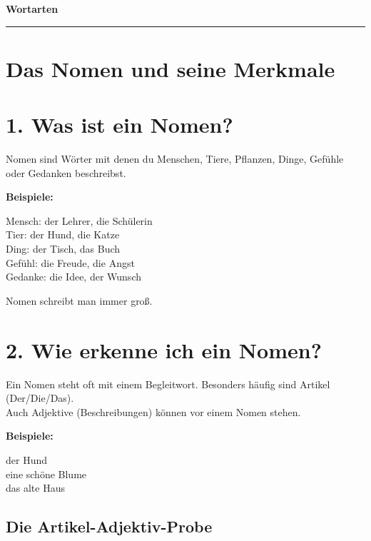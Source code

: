 \documentclass[a4paper,12pt]{article}
\newcommand{\linie}{\vspace{4pt}\hrule\vspace{10pt}}
\begin{document}
\begin{center}
    {\headerfont\LARGE\textbf{Wortarten}}\\[4pt]
\end{center}

\vspace{6pt}
\linie

\section*{Das Nomen und seine Merkmale}

\section*{1. Was ist ein Nomen?}

Nomen sind Wörter mit denen du Menschen, Tiere, Pflanzen, Dinge, Gefühle oder Gedanken beschreibst.

\textbf{Beispiele:}

Mensch: der Lehrer, die Schülerin\\  
Tier: der Hund, die Katze  \\
Ding: der Tisch, das Buch \\ 
Gefühl: die Freude, die Angst  \\
Gedanke: die Idee, der Wunsch  \\

\begin{merksatz}
Nomen schreibt man immer groß.
\end{merksatz}

\section*{2. Wie erkenne ich ein Nomen?}

Ein Nomen steht oft mit einem Begleitwort. Besonders häufig sind Artikel (Der/Die/Das). \\
Auch Adjektive (Beschreibungen) können vor einem Nomen stehen.

\textbf{Beispiele:}

der Hund\\
eine schöne Blume\\ 
das alte Haus

\subsection*{Die Artikel-Adjektiv-Probe}
\end{document}
